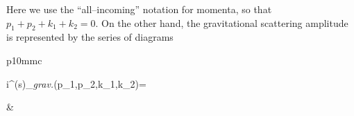 \documentclass[11pt,a4paper]{article}
\newcommand{\M}{\mathcal{M}}
\begin{document}
Here we use the ``all--incoming'' notation for momenta, so that $p_1+p_2+k_1+k_2=0$. On the other hand, the gravitational scattering amplitude is represented by the series of diagrams
\newline
\begin{tabular}{p{10mm}c}
\begin{flalign*}
i\M^{(s)}_{\textit{grav.}}(p_1,p_2,k_1,k_2)=
\end{flalign*}
&
 \\

\end{tabular}
\end{document}
